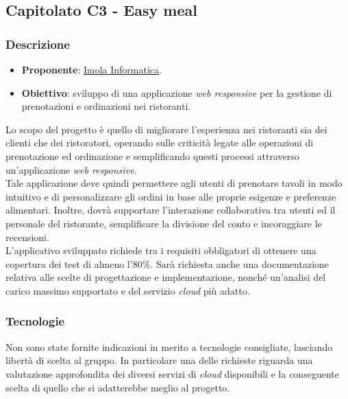 \subsection{Capitolato C3 - Easy meal}


\subsubsection{Descrizione}
\begin{itemize}
    \item \textbf{Proponente}: \href{https://imolainformatica.it/}{Imola Informatica}.
    \item \textbf{Obiettivo}: sviluppo di una applicazione \textit{web responsive} per la gestione di prenotazioni e ordinazioni nei ristoranti.
\end{itemize}
Lo scopo del progetto è quello di migliorare l'esperienza nei ristoranti sia dei clienti che dei ristoratori, operando sulle criticità legate alle operazioni di prenotazione ed ordinazione e semplificando questi processi attraverso un'applicazione \textit{web responsive}.\\ 
Tale applicazione deve quindi permettere agli utenti di prenotare tavoli in modo intuitivo e di personalizzare gli ordini in base alle proprie esigenze e preferenze alimentari. 
Inoltre, dovrà supportare l'interazione collaborativa tra utenti ed il personale del ristorante, semplificare la divisione del conto e incoraggiare le recensioni.\\ 
L'applicativo sviluppato richiede tra i requisiti obbligatori di ottenere una copertura dei test di almeno l'$80\%$. 
Sarà richiesta anche una documentazione relativa alle scelte di progettazione e implementazione, nonché un'analisi del carico massimo supportato e del servizio \textit{cloud} più adatto.

\subsubsection{Tecnologie}
Non sono state fornite indicazioni in merito a tecnologie consigliate, lasciando libertà di scelta al gruppo. 
In particolare una delle richieste riguarda una valutazione approfondita dei diversi servizi di \textit{cloud} disponibili e la conseguente scelta di quello che si adatterebbe meglio al progetto.


